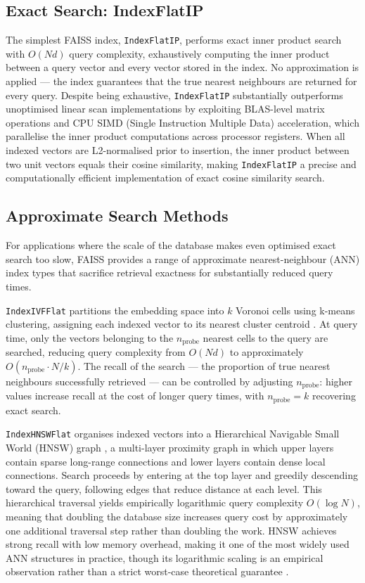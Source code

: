 \subsection*{Exact Search: IndexFlatIP}

The simplest FAISS index, \texttt{IndexFlatIP}, performs exact inner 
product search with $O(Nd)$ query complexity, exhaustively computing 
the inner product between a query vector and every vector stored in the 
index. No approximation is applied --- the index guarantees that the 
true nearest neighbours are returned for every query. Despite being 
exhaustive, \texttt{IndexFlatIP} substantially outperforms 
unoptimised linear scan implementations by exploiting BLAS-level matrix 
operations and CPU SIMD (Single Instruction Multiple Data) 
acceleration, which parallelise the inner product computations across 
processor registers. When all indexed vectors are L2-normalised prior 
to insertion, the inner product between two unit vectors equals their 
cosine similarity, making \texttt{IndexFlatIP} a precise and 
computationally efficient implementation of exact cosine similarity 
search.

\subsection*{Approximate Search Methods}

For applications where the scale of the database makes even optimised 
exact search too slow, FAISS provides a range of approximate 
nearest-neighbour (ANN) index types that sacrifice retrieval exactness 
for substantially reduced query times.

\texttt{IndexIVFFlat} partitions the embedding space into $k$ Voronoi 
cells using k-means clustering, assigning each indexed vector to its 
nearest cluster centroid \cite{Jegou_2011_PQ}. At query time, only the 
vectors belonging to the $n_\text{probe}$ nearest cells to the query 
are searched, reducing query complexity from $O(Nd)$ to approximately 
$O(n_\text{probe} \cdot N/k)$. The recall of the search --- the 
proportion of true nearest neighbours successfully retrieved --- can be 
controlled by adjusting $n_\text{probe}$: higher values increase recall 
at the cost of longer query times, with $n_\text{probe} = k$ 
recovering exact search.

\texttt{IndexHNSWFlat} organises indexed vectors into a Hierarchical 
Navigable Small World (HNSW) graph \cite{Malkov_2020_HNSW}, a 
multi-layer proximity graph in which upper layers contain sparse 
long-range connections and lower layers contain dense local connections. 
Search proceeds by entering at the top layer and greedily descending 
toward the query, following edges that reduce distance at each level. 
This hierarchical traversal yields empirically logarithmic query 
complexity $O(\log N)$, meaning that doubling the database size 
increases query cost by approximately one additional traversal step 
rather than doubling the work. HNSW achieves strong recall with low 
memory overhead, making it one of the most widely used ANN structures 
in practice, though its logarithmic scaling is an empirical 
observation rather than a strict worst-case theoretical guarantee 
\cite{Malkov_2020_HNSW}.

